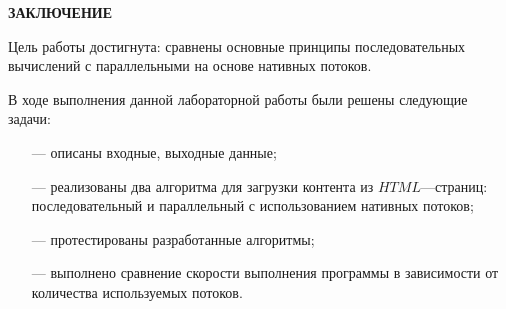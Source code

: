 \begin{center}
    \textbf{ЗАКЛЮЧЕНИЕ}
\end{center}

Цель работы достигнута: сравнены основные принципы последовательных вычислений с параллельными на основе нативных потоков.

\vspace{5mm}

В ходе выполнения данной лабораторной работы были решены следующие задачи:
\begin{itemize}
    \item[---] описаны входные, выходные данные;
    \item[---] реализованы два алгоритма для загрузки контента из $HTML$---страниц: последовательный и параллельный с использованием нативных потоков;
    \item[---] протестированы разработанные алгоритмы;
    \item[---] выполнено сравнение скорости выполнения программы в зависимости от количества используемых потоков.
\end{itemize}

